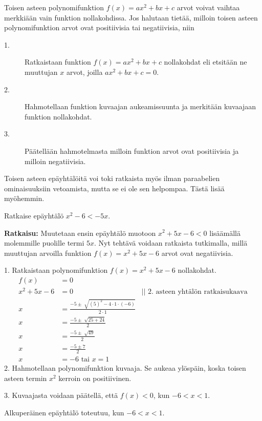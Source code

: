Toisen asteen polynomifunktion $f(x)=ax^2+bx+c$ arvot voivat vaihtaa merkkiään vain funktion nollakohdissa. Jos halutaan tietää, milloin toisen asteen polynomifunktion arvot ovat positiivisia tai negatiivisia, niin
\begin{description}
\item[1.] Ratkaistaan funktion $f(x)=ax^2+bx+c$ nollakohdat eli etsitään ne muuttujan $x$ arvot, joilla $ax^2+bx+c=0$.
\item[2.] Hahmotellaan funktion kuvaajan aukeamissuunta ja merkitään kuvaajaan funktion nollakohdat.
\item[3.] Päätellään hahmotelmasta milloin funktion arvot ovat positiivisia ja milloin negatiivisia.
\end{description}

Toisen asteen epäyhtälöitä voi toki ratkaista myös ilman paraabelien ominaisuuksiin vetoamista, mutta se ei ole sen helpompaa. Tästä lisää myöhemmin. %

\newpage %
\begin{esimerkki} 
Ratkaise epäyhtälö $x^2-6<-5x$.
 
\textbf{Ratkaisu:}
Muutetaan ensin epäyhtälö muotoon $x^2+5x-6<0$ lisäämällä molemmille puolille termi $5x$. Nyt tehtävä voidaan ratkaista tutkimalla, millä muuttujan arvoilla funktion $f(x)=x^2+5x-6$ arvot ovat negatiivisia.
 
1. Ratkaistaan polynomifunktion $f(x)=x^2+5x-6$ nollakohdat.
\begin{align*}
f(x)&=0 & \\
x^2+5x-6&=0 \ \  \ \ \ & || \text{ 2. asteen yhtälön ratkaisukaava} \\ 
x&=\frac{-5 \pm \sqrt[]{(5)^2-4 \cdot 1 \cdot(-6)}}{2 \cdot 1} & \\
x&=\frac{-5 \pm \sqrt[]{25+24}}{2} & \\
x&=\frac{-5 \pm \sqrt[]{49}}{2} & \\
x&=\frac{-5 \pm 7}{2} & \\
x&=-6 \text{ tai } x=1 &
\end{align*}
2. Hahmotellaan polynomifunktion kuvaaja. Se aukeaa ylöspäin, koska toisen
asteen termin $x^2$ kerroin on positiivinen.
 
\begin{lukusuora}{-2.5}{2.5}{5}
\end{lukusuora}
 
3.  Kuvaajasta voidaan päätellä, että $f(x)<0$, kun $-6 < x < 1$.
 
\begin{esimvast} 
Alkuperäinen epäyhtälö toteutuu, kun $-6 < x <1$.  
\end{esimvast}
\end{esimerkki}


